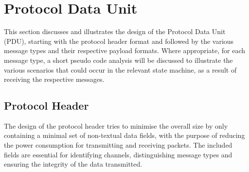 





\section{Protocol Data Unit} %
\label{sec:protocol_data_unit}
This section discusses and illustrates the design of the Protocol Data Unit (PDU), starting with the protocol header format and followed by the various message types and their respective payload formats. Where appropriate, for each message type, a short pseudo code analysis will be discussed to illustrate the various scenarios that could occur in the relevant state machine, as a result of receiving the respective messages.

\subsection{Protocol Header} %
\label{sub:protocol_header}
The design of the protocol header tries to minimise the overall size by only containing a minimal set of non-textual data fields, with the purpose of reducing the power consumption for transmitting and receiving packets. The included fields are essential for identifying channels, distinguishing message types and ensuring the integrity of the data transmitted.

